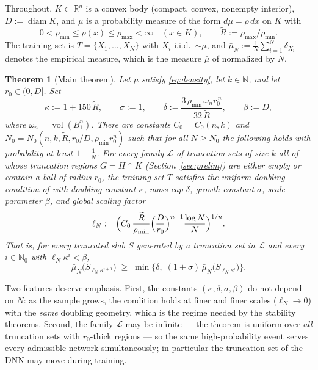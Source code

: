 \documentclass[11pt]{article}
\newtheorem{theorem}{Theorem}[section]
\newcommand{\R}{\mathbb{R}}
\newcommand{\emp}{\bar\mu_N}
\newcommand{\vol}{\operatorname{vol}}
\newcommand{\diam}{\operatorname{diam}}
\begin{document}
Throughout, $K\subset\R^n$ is a convex body (compact, convex, nonempty interior),
$D:=\diam K$, and $\mu$ is a probability measure of the form
$d\mu=\rho\,dx$ on $K$ with
\begin{equation}\label{eq:density}
0<\rho_{\min}\le\rho(x)\le\rho_{\max}<\infty\quad(x\in K),
\qquad
\widetilde R:=\rho_{\max}/\rho_{\min}.
\end{equation}
The training set is $T=\{X_1,\dots,X_N\}$ with $X_i$ i.i.d.\ $\sim\mu$, and
$\emp:=\frac1N\sum_{i=1}^N\delta_{X_i}$ denotes the empirical measure, which is the
measure $\bar\mu$ of \cite{ShmaloUDC} normalized by $N$.

\begin{theorem}[Main theorem]\label{thm:main}
Let $\mu$ satisfy \eqref{eq:density}, let $k\in\mathbb N$, and let $r_0\in(0,D]$.
Set
\[
\kappa:=1+150\,\widetilde R,
\qquad
\sigma:=1,
\qquad
\delta:=\frac{3\,\rho_{\min}\,\omega_n r_0^{\,n}}{32\,\widetilde R},
\qquad
\beta:=D,
\]
where $\omega_n=\vol(B^n_1)$.  There are constants $C_0=C_0(n,k)$ and
$N_0=N_0(n,k,\widetilde R,r_0/D,\rho_{\min}r_0^n)$ such that for all $N\ge N_0$ the
following holds with probability at least $1-\frac1N$.  For \emph{every} family
$\mathcal L$ of truncation sets of size $k$ all of whose truncation regions
$G=H\cap K$ (Section~\ref{sec:prelim}) are either empty or contain a ball of radius
$r_0$, the training set $T$ satisfies the uniform doubling condition of
\cite[Definition 3.3]{ShmaloUDC} with doubling constant $\kappa$, mass cap $\delta$,
growth constant $\sigma$, scale parameter $\beta$, and global scaling factor
\[
\ell_N:=\Bigl(C_0\,\frac{\widetilde R}{\rho_{\min}}\Bigl(\frac{D}{r_0}\Bigr)^{n-1}
\frac{\log N}{N}\Bigr)^{1/n}.
\]
That is, for every truncated slab $S$ generated by a truncation set in $\mathcal L$
and every $i\in\mathbb N_0$ with $\ell_N\kappa^i<\beta$,
\[
\emp\bigl(S_{\ell_N\kappa^{i+1}}\bigr)\;\ge\;
\min\bigl\{\delta,\;(1+\sigma)\,\emp\bigl(S_{\ell_N\kappa^{i}}\bigr)\bigr\}.
\]
\end{theorem}

Two features deserve emphasis.  First, the constants $(\kappa,\delta,\sigma,\beta)$
do not depend on $N$: as the sample grows, the condition holds at finer and finer
scales ($\ell_N\to0$) with the \emph{same} doubling geometry, which is the regime
needed by the stability theorems.  Second, the family $\mathcal L$ may be infinite
--- the theorem is uniform over \emph{all} truncation sets with $r_0$-thick regions
--- so the same high-probability event serves every admissible network
simultaneously; in particular the truncation set of the DNN may move during training.
\end{document}
